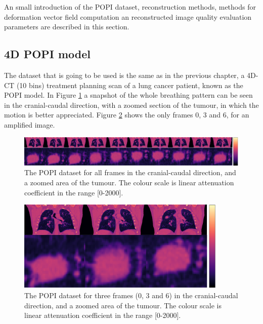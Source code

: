 An small introduction of the POPI dataset, reconstruction methods, methods for deformation vector field computation an reconstructed image quality evaluation parameters are described in this section. 






\subsection{4D POPI model}

The dataset that is going to be used is the same as in the previous chapter, a 4D-CT (10 bins) treatment planning scan of a lung cancer patient, known as the POPI model. In Figure \ref{fig:POPIfull} a snapshot of the whole breathing pattern can be seen in the cranial-caudal direction, with a zoomed section of the tumour, in which the motion is better appreciated. Figure \ref{fig:POPI3} shows the only frames 0, 3 and 6, for an amplified image.

\begin{figure}
\begin{center}

\includegraphics[width=\textwidth]{accuracyMC/imagerall.png} 


\end{center}

\caption[The whole 4D dataset in CC direction]{\label{fig:POPIfull} The POPI dataset for all frames in the cranial-caudal direction, and a zoomed area of the tumour.  The colour scale is linear attenuation coefficient in the range [0-2000].} 
\end{figure}
\begin{figure}
\begin{center}

\includegraphics[width=0.9\textwidth]{accuracyMC/imager3.png} 


\end{center}

\caption[Three frames of the 4D dataset in CC direction]{\label{fig:POPI3} The POPI dataset for three frames (0, 3 and 6) in the cranial-caudal direction, and a zoomed area of the tumour.  The colour scale is linear attenuation coefficient in the range [0-2000].} 
\end{figure}

